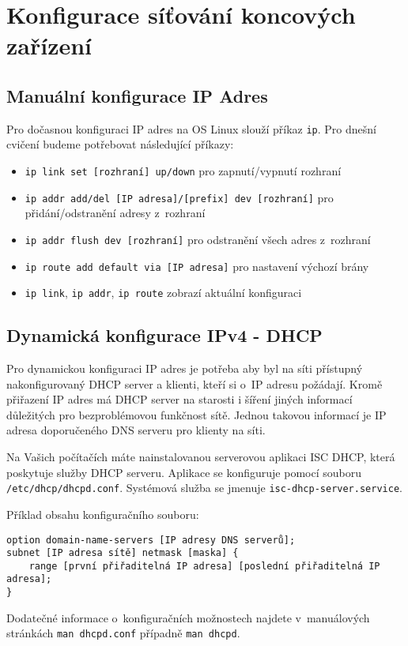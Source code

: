 \section{Konfigurace síťování koncových zařízení}
\label{ipconfig}

\subsection{Manuální konfigurace IP Adres}\label{ip_manual}
Pro dočasnou konfiguraci IP adres na OS Linux slouží příkaz {\tt ip}. Pro
dnešní cvičení budeme potřebovat následující příkazy:
\begin{itemize}
    \item \verb_ip link set [rozhraní] up/down_ pro zapnutí/vypnutí rozhraní
    \item \verb_ip addr add/del [IP adresa]/[prefix] dev [rozhraní]_ pro
        přidání/odstranění adresy z~rozhraní
    \item \verb_ip addr flush dev [rozhraní]_ pro odstranění všech adres
z~rozhraní
    \item \verb_ip route add default via [IP adresa]_ pro nastavení výchozí
        brány
    \item \verb_ip link_, \verb_ip addr_, \verb_ip route_ zobrazí aktuální
        konfiguraci
\end{itemize}

\subsection{Dynamická konfigurace IPv4 - DHCP}\label{dhcp}
Pro dynamickou konfiguraci IP adres je potřeba aby byl na síti přístupný
nakonfigurovaný DHCP server a klienti, kteří si o~IP adresu požádají. Kromě
přiřazení IP adres má DHCP server na starosti i šíření jiných informací
důležitých pro bezproblémovou funkčnost sítě. Jednou takovou informací je IP
adresa doporučeného DNS serveru pro klienty na síti.

Na Vašich počítačích máte nainstalovanou serverovou aplikaci ISC DHCP, která
poskytuje služby DHCP serveru. Aplikace se konfiguruje pomocí souboru
\verb_/etc/dhcp/dhcpd.conf_. Systémová služba se jmenuje
\texttt{isc-dhcp-server.service}.

Příklad obsahu konfiguračního souboru:
\begin{verbatim}
option domain-name-servers [IP adresy DNS serverů];
subnet [IP adresa sítě] netmask [maska] {
    range [první přiřaditelná IP adresa] [poslední přiřaditelná IP adresa];
}
\end{verbatim}
Dodatečné informace o~konfiguračních možnostech najdete v~manuálových stránkách
{\tt man dhcpd.conf} případně {\tt man dhcpd}.

